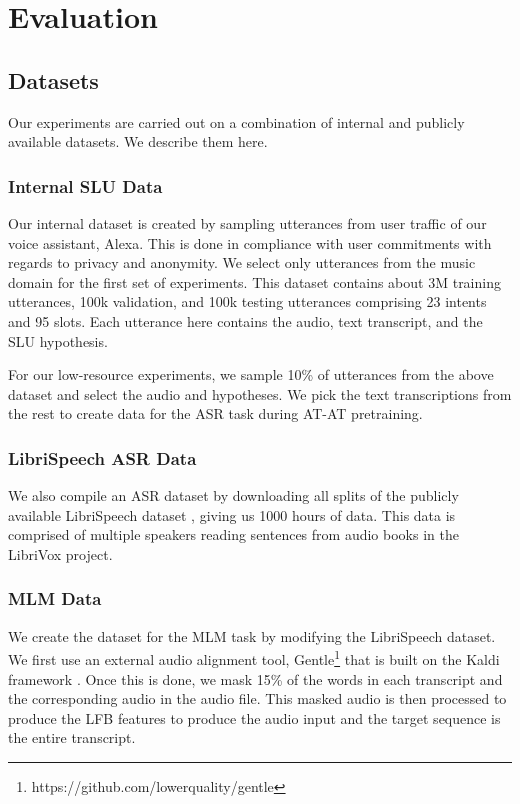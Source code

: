 \documentclass[letterpaper]{article} \usepackage{aaai21}  \usepackage{times}  \usepackage{helvet} \usepackage{courier}  \usepackage[hyphens]{url}  \usepackage{graphicx} \usepackage{booktabs}
\begin{document}
\section{Evaluation}
\subsection{Datasets}
Our experiments are carried out on a combination of internal and publicly available datasets. We describe them here.

\subsubsection{Internal SLU Data}
Our internal dataset is created by sampling utterances from user traffic of our voice assistant, Alexa. This is done in compliance with user commitments with regards to privacy and anonymity.  We select only utterances from the music domain for the first set of experiments. This dataset contains about 3M training utterances, 100k validation, and 100k testing utterances comprising 23 intents and 95 slots. Each utterance here contains the audio, text transcript, and the SLU hypothesis.

For our low-resource experiments, we sample 10\% of utterances from the above dataset and select the audio and hypotheses. We pick the text transcriptions from the rest to create data for the ASR task during AT-AT pretraining. 

\subsubsection{LibriSpeech ASR Data}
We also compile an ASR dataset by downloading all splits of the publicly available LibriSpeech dataset \cite{Panayotov2015LibrispeechAA}, giving us 1000 hours of data. This data is comprised of multiple speakers reading sentences from audio books in the LibriVox project.

\subsubsection{MLM Data}
We create the dataset for the MLM task by modifying the LibriSpeech dataset. We first use an external audio alignment tool, Gentle\footnote{https://github.com/lowerquality/gentle} that is built on the Kaldi framework \cite{Povey2011TheKS}. Once this is done, we mask 15\% of the words in each transcript and the corresponding audio in the audio file. This masked audio is then processed to produce the LFB features to produce the audio input and the target sequence is the entire transcript.
\end{document}
